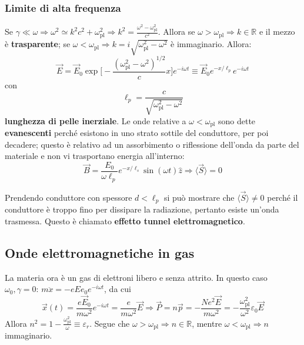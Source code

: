 \documentclass[a4paper]{scrartcl}
\numberwithin{equation}{subsection}
\theoremstyle{style1}
\begin{document}
\subsubsection{Limite di alta frequenza}
Se $\gamma \ll \omega\Rightarrow  \omega^2 \simeq k^2 c^2 + \omega_\text{pl}^2\Rightarrow k^2 = \frac{\omega^2 -\omega_\text{pl}^2}{c^2}$. Allora se $\omega > \omega_\text{pl}\Rightarrow k \in \mathbb{R}$ e il mezzo \`e \textbf{trasparente}; se $\omega < \omega_\text{pl} \Rightarrow k = i \sqrt{\omega_\text{pl}^2 - \omega^2} $ \`e immaginario. Allora:
\[
\vec{E}= \vec{E}_0 \exp \Bigg[ - \frac{(\omega_\text{pl}^2 -\omega^2)^{1 / 2} }{c}x \Bigg] e^{-i\omega t} \equiv\vec{E}_0 e^{ - x / \ell _p}  e^{-i\omega t} 
\] 
con 
\begin{equation}
	\ell _p = \frac{c}{\sqrt{\omega_\text{pl}^2 - \omega^2} }
\end{equation}
\textbf{lunghezza di pelle inerziale}. Le onde relative a $\omega < \omega_\text{pl}$ sono dette \textbf{evanescenti} perch\'e esistono in uno strato sottile del conduttore, per poi decadere; questo \`e relativo ad un assorbimento o riflessione dell'onda da parte del materiale e non vi trasportano energia all'interno:
\begin{equation}
	\vec{B}= \frac{E_0}{\omega \ell_p}e^{- x / \ell_s} \sin (\omega t) \hat{z}\Rightarrow \langle \vec{S} \rangle=0
\end{equation}

Prendendo conduttore con spessore $d<\ell _p$ si pu\`o mostrare che $\langle \vec{S} \rangle\neq 0$ perch\'e il conduttore \`e troppo fino per dissipare la radiazione, pertanto esiste un'onda trasmessa. Questo \`e chiamato \textbf{effetto tunnel elettromagnetico}.

\subsection{Onde elettromagnetiche in gas}
La materia ora \`e un gas di elettroni libero e senza attrito. In questo caso $\omega_0,\gamma = 0$: $m\ddot{x} = - eE e_0e^{-i\omega t} $, da cui
\begin{equation}
	\vec{x}(t) = \frac{e\vec{E}_0}{m\omega^2}e^{-i\omega t} = \frac{e}{m\omega^2}\vec{E} \Rightarrow \vec{P}= n\vec{p}= - \frac{Ne^2 \vec{E}}{m\omega^2} = - \frac{\omega_\text{pl}^2}{\omega^2}\varepsilon _0 \vec{E}
\end{equation}
Allora $n^2 = 1 - \frac{\omega_\text{pl}^2}{\omega} \equiv \varepsilon _r$. Segue che $\omega>\omega_\text{pl}\Rightarrow n \in \mathbb{R}$, mentre $\omega < \omega_\text{pl}\Rightarrow n$ immaginario.
\newpage
\end{document}
